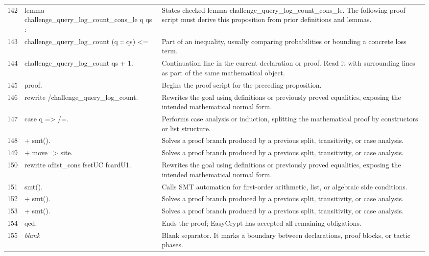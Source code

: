 \documentclass[10pt]{article}
\begin{document}
\begin{longtable}{r L{0.53\textwidth} L{0.37\textwidth}}
142 & {\ttfamily\scriptsize lemma challenge\_query\_log\_count\_cons\_le q qs :} & States checked lemma challenge\_query\_log\_count\_cons\_le.  The following proof script must derive this proposition from prior definitions and lemmas. \\
143 & {\ttfamily\scriptsize   challenge\_query\_log\_count (q :: qs) <=} & Part of an inequality, usually comparing probabilities or bounding a concrete loss term. \\
144 & {\ttfamily\scriptsize   challenge\_query\_log\_count qs + 1.} & Continuation line in the current declaration or proof.  Read it with surrounding lines as part of the same mathematical object. \\
145 & {\ttfamily\scriptsize proof.} & Begins the proof script for the preceding proposition. \\
146 & {\ttfamily\scriptsize rewrite /challenge\_query\_log\_count.} & Rewrites the goal using definitions or previously proved equalities, exposing the intended mathematical normal form. \\
147 & {\ttfamily\scriptsize case q => /=.} & Performs case analysis or induction, splitting the mathematical proof by constructors or list structure. \\
148 & {\ttfamily\scriptsize + smt().} & Solves a proof branch produced by a previous split, transitivity, or case analysis. \\
149 & {\ttfamily\scriptsize + move=> site.} & Solves a proof branch produced by a previous split, transitivity, or case analysis. \\
150 & {\ttfamily\scriptsize   rewrite oflist\_cons fsetUC fcardU1.} & Rewrites the goal using definitions or previously proved equalities, exposing the intended mathematical normal form. \\
151 & {\ttfamily\scriptsize   smt().} & Calls SMT automation for first-order arithmetic, list, or algebraic side conditions. \\
152 & {\ttfamily\scriptsize + smt().} & Solves a proof branch produced by a previous split, transitivity, or case analysis. \\
153 & {\ttfamily\scriptsize + smt().} & Solves a proof branch produced by a previous split, transitivity, or case analysis. \\
154 & {\ttfamily\scriptsize qed.} & Ends the proof; EasyCrypt has accepted all remaining obligations. \\
155 & {\ttfamily\scriptsize \emph{blank}} & Blank separator.  It marks a boundary between declarations, proof blocks, or tactic phases. \\

\end{longtable}
\end{document}
